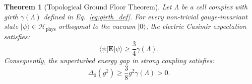 \documentclass[11pt,reqno]{article}
\newtheorem{theorem}{Theorem}[section]
\begin{document}
\begin{theorem}[Topological Ground Floor Theorem]
\label{thm:casimir_coercivity}
Let $\Lambda$ be a cell complex with girth $\gamma(\Lambda)$ defined in Eq.~\eqref{eq:girth_def}. For every non-trivial gauge-invariant state $|\psi\rangle \in \mathcal{H}_{\mathrm{phys}}$ orthogonal to the vacuum $|0\rangle$, the electric Casimir expectation satisfies:
\begin{equation}
    \label{eq:casimir_coercivity_bound}
    \langle \psi | \mathbf{E} | \psi \rangle \ge \frac{3}{4} \gamma(\Lambda).
\end{equation}
Consequently, the unperturbed energy gap in strong coupling satisfies:
\begin{equation}
    \label{eq:unperturbed_gap_bound}
    \Delta_0(g^2) \ge \frac{3}{8} g^2 \gamma(\Lambda) > 0.
\end{equation}
\end{theorem}
\end{document}
